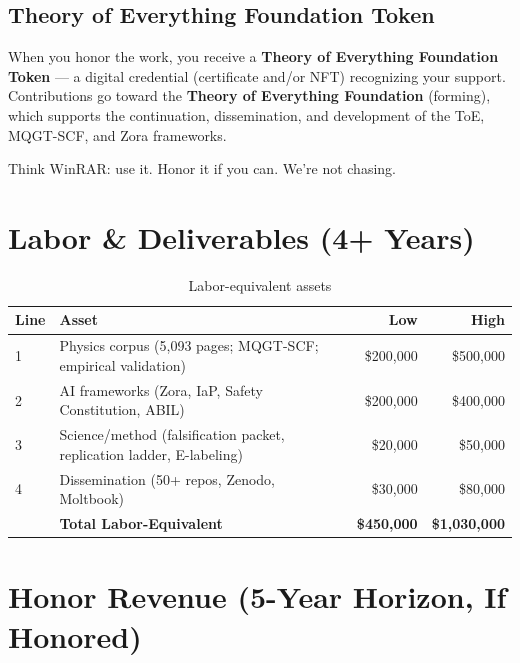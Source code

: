 \documentclass[11pt,a4paper]{article}
\begin{document}
\subsection{Theory of Everything Foundation Token}

When you honor the work, you receive a \textbf{Theory of Everything Foundation Token} — a digital credential (certificate and/or NFT) recognizing your support. Contributions go toward the \textbf{Theory of Everything Foundation} (forming), which supports the continuation, dissemination, and development of the ToE, MQGT-SCF, and Zora frameworks.

Think WinRAR: use it. Honor it if you can. We're not chasing.

\section{Labor \& Deliverables (4+ Years)}

\begin{table}[htbp]
\centering
\caption{Labor-equivalent assets}
\begin{tabular}{llrr}
\toprule
\textbf{Line} & \textbf{Asset} & \textbf{Low} & \textbf{High} \\
\midrule
1 & Physics corpus (5,093 pages; MQGT-SCF; empirical validation) & \$200,000 & \$500,000 \\
2 & AI frameworks (Zora, IaP, Safety Constitution, ABIL) & \$200,000 & \$400,000 \\
3 & Science/method (falsification packet, replication ladder, E-labeling) & \$20,000 & \$50,000 \\
4 & Dissemination (50+ repos, Zenodo, Moltbook) & \$30,000 & \$80,000 \\
\midrule
& \textbf{Total Labor-Equivalent} & \textbf{\$450,000} & \textbf{\$1,030,000} \\
\bottomrule
\end{tabular}
\end{table}

\section{Honor Revenue (5-Year Horizon, If Honored)}
\end{document}
